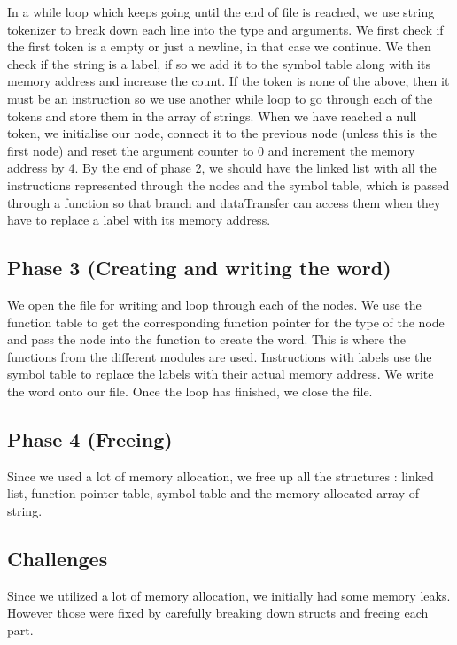 \documentclass[12pt]{article}
\begin{document}
In a while loop which keeps going until the end of file is reached, we use string tokenizer to break down each line into the type and arguments. We first check if the first token is a empty or just a newline, in that case we continue. We then check if the string is a label, if so we add it to the symbol table along with its memory address and increase the count. If the token is none of the above, then it must be an instruction so we use another while loop to go through each of the tokens and store them in the array of strings. When we have reached a null token, we initialise our node, connect it to the previous node (unless this is the first node) and reset the argument counter to 0 and increment the memory address by 4.
By the end of phase 2, we should have the linked list with all the instructions represented through the nodes and the symbol table, which is passed through a function so that branch and dataTransfer can access them when they have to replace a label with its memory address.

\subsection{Phase 3 (Creating and writing the word)}

We open the file for writing and loop through each of the nodes. We use the function table to get the corresponding function pointer for the type of the node and pass the node into the function to create the word. This is where the functions from the different modules are used. Instructions with labels use the symbol table to replace the labels with their actual memory address.  We write the word onto our file. Once the loop has finished, we close the file.

\subsection{Phase 4 (Freeing)}

Since we used a lot of memory allocation, we free up all the structures : linked list, function pointer table, symbol table and the memory allocated array of string.

\subsection{Challenges}

Since we utilized a lot of memory allocation, we initially had some memory leaks. However those were fixed by carefully breaking down structs and freeing each part.
\end{document}
